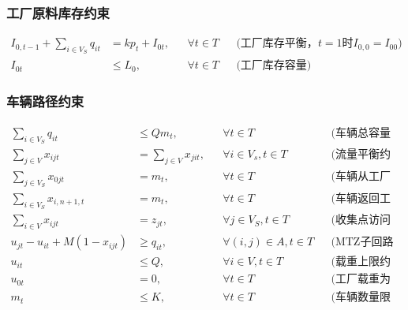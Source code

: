 \documentclass{article}
\begin{document}
\subsubsection{工厂原料库存约束}
\vspace{-1.5ex}
\begin{align}
I_{0,t-1} + \sum_{i \in V_S} q_{it} &= k p_t + I_{0t}, && \forall t \in T && \text{(工厂库存平衡，$t=1$时$I_{0,0}=I_{00}$)} \\
I_{0t} &\leq L_0, && \forall t \in T && \text{(工厂库存容量)}
\end{align}

\subsubsection{车辆路径约束}
\vspace{-1.5ex}
\begin{align}
\sum_{i \in V_S} q_{it} &\leq Q m_t, && \forall t \in T && \text{(车辆总容量限制)} \\
\sum_{j \in V} x_{ijt} &= \sum_{j \in V} x_{jit}, && \forall i \in V_s, t \in T && \text{(流量平衡约束)} \\
\sum_{j \in V_S} x_{0jt} &= m_t, && \forall t \in T && \text{(车辆从工厂出发)} \\
\sum_{i \in V_S} x_{i,n+1,t} &= m_t, && \forall t \in T && \text{(车辆返回工厂)} \\
\sum_{i \in V} x_{ijt} &= z_{jt}, && \forall j \in V_S, t \in T && \text{(收集点访问约束)} \\
u_{jt} - u_{it} + M(1-x_{ijt}) &\geq q_{it}, && \forall (i,j) \in A, t \in T && \text{(MTZ子回路消除)} \\
u_{it} &\leq Q, && \forall i \in V, t \in T && \text{(载重上限约束)} \\
u_{0t} &= 0, && \forall t \in T && \text{(工厂载重为零)} \\
m_t &\leq K, && \forall t \in T && \text{(车辆数量限制)}
\end{align}
\end{document}
